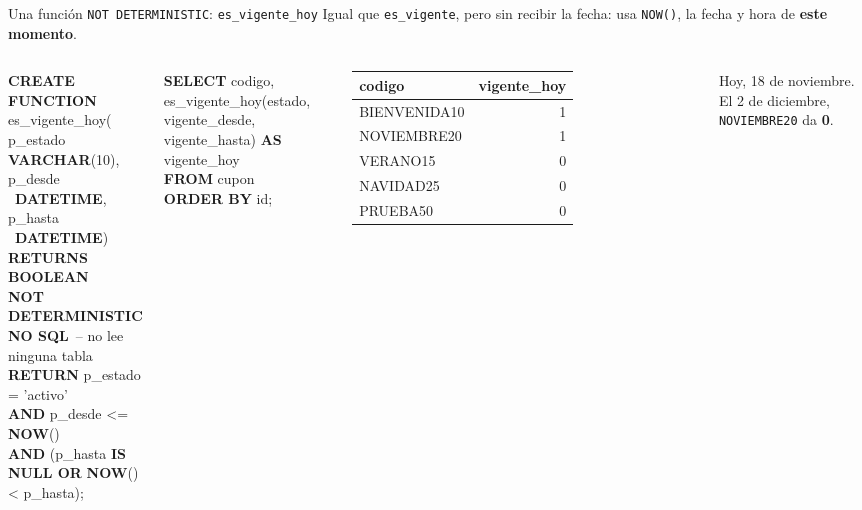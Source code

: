 \documentclass[aspectratio=169,10pt,c]{beamer}
\newcommand{\kw}[1]{\textcolor{utpRojo}{\textbf{#1}}}
\newcommand{\com}[1]{\textcolor{utpGrisMedio}{#1}}
\newcommand{\gris}[1]{\textcolor{utpGris}{#1}}
\newcommand{\dentro}[1]{{\setlength{\fboxsep}{1.5pt}\colorbox{yellow!45}{#1}}}
\newcommand{\fila}{\rowcolor{yellow!45}}
\newenvironment{sqlmini}[1][.86\textwidth]
  {\begin{center}\begin{lrbox}{\sqlbuf}\begin{minipage}{#1}\ttfamily\fontsize{7}{8.3}\selectfont\vspace{4pt}\raggedright}
  {\vspace{4pt}\end{minipage}\end{lrbox}\colorbox{utpGrisClaro}{\usebox{\sqlbuf}}\end{center}}
\newenvironment{sqlmicro}[1][.86\textwidth]
  {\begin{center}\begin{lrbox}{\sqlbuf}\begin{minipage}{#1}\ttfamily\fontsize{6.4}{7.5}\selectfont\vspace{4pt}\raggedright}
  {\vspace{4pt}\end{minipage}\end{lrbox}\colorbox{utpGrisClaro}{\usebox{\sqlbuf}}\end{center}}
\newcommand{\col}{\dimexpr\textwidth-2\fboxsep\relax}
\newcommand{\ind}{\hspace*{1.2em}}
\newcommand{\cab}[1]{\normalfont\bfseries #1}
\newcommand{\res}[3]{%
  \centering{\scriptsize\color{utpGris}resultado}\\[3pt]
  \footnotesize\ttfamily
  \begin{tabular}{#1}
  \toprule
  #2 \\
  \midrule
  #3
  \bottomrule
  \end{tabular}}
\begin{document}
\begin{frame}{Una función \texttt{NOT DETERMINISTIC}: \texttt{es\_vigente\_hoy}}
\small Igual que \texttt{es\_vigente}, pero sin recibir la fecha: usa \texttt{NOW()}, la fecha y hora de \textbf{este momento}.
\begin{columns}[c,onlytextwidth]
\begin{sqlmini}[\col]
\kw{CREATE FUNCTION} es\_vigente\_hoy(\\
\ind p\_estado \kw{VARCHAR}(10),\\
\ind p\_desde \ \kw{DATETIME},\\
\ind p\_hasta \ \kw{DATETIME})\\
\kw{RETURNS BOOLEAN}\\
\dentro{\kw{NOT DETERMINISTIC}}\\
\kw{NO SQL}\ \com{-- no lee ninguna tabla}\\
\kw{RETURN} p\_estado = 'activo'\\
\ind\ind\kw{AND} p\_desde <= \dentro{\kw{NOW}()}\\
\ind\ind\kw{AND} (p\_hasta \kw{IS NULL OR} \dentro{\kw{NOW}()} < p\_hasta);
\end{sqlmini}
\begin{sqlmicro}[\col]
\kw{SELECT} codigo,\\
\ind es\_vigente\_hoy(estado, vigente\_desde,\\
\ind\ind vigente\_hasta) \kw{AS} vigente\_hoy\\
\kw{FROM} cupon \kw{ORDER BY} id;
\end{sqlmicro}
\vspace{-6pt}
\res{lr}{\cab{codigo} & \cab{vigente\_hoy}}{BIENVENIDA10 & 1 \\ \fila NOVIEMBRE20 & 1 \\ VERANO15 & 0 \\ NAVIDAD25 & 0 \\ PRUEBA50 & 0 \\}
\par\vspace{3pt}
{\centering\normalfont\scriptsize\gris{Hoy, 18 de noviembre. El 2 de diciembre, \texttt{NOVIEMBRE20} da \textbf{0}.}\par}
\end{columns}
\vspace{0.1cm}
\end{frame}
\end{document}
